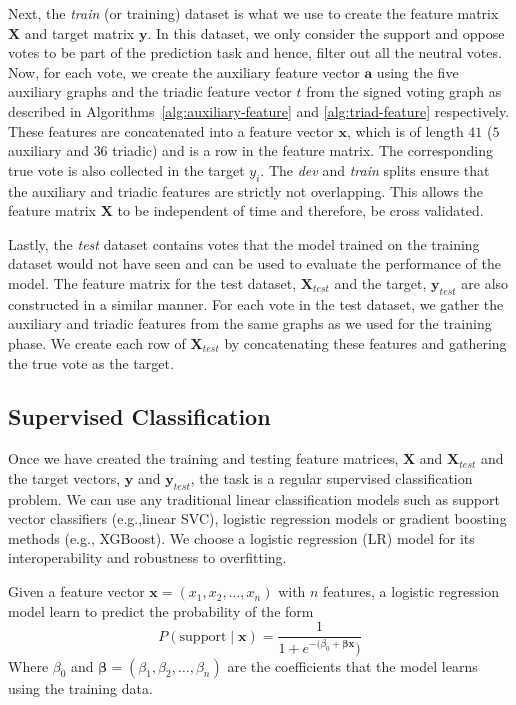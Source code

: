 Next, the \textit{train} (or training) dataset is what we use to create the feature matrix $\mathbf{X}$ and target matrix $\mathbf{y}$.
In this dataset, we only consider the support and oppose votes to be part of the prediction task and hence, filter out all the neutral votes.
Now, for each vote, we create the auxiliary feature vector $\textbf{a}$ using the five auxiliary graphs and the triadic feature vector $t$ from the signed voting graph as described in Algorithms~\ref{alg:auxiliary-feature} and \ref{alg:triad-feature} respectively.
These features are concatenated into a feature vector $\textbf{x}$, which is of length $41$ ($5$ auxiliary and $36$ triadic) and is a row in the feature matrix.
The corresponding true vote is also collected in the target $y_i$.
The \textit{dev} and \textit{train} splits ensure that the auxiliary and triadic features are strictly not overlapping.
This allows the feature matrix $\textbf{X}$ to be independent of time and therefore, be cross validated.

Lastly, the \textit{test} dataset contains votes that the model trained on the training dataset would not have seen and can be used to evaluate the performance of the model.
The feature matrix for the test dataset, $\mathbf{X}_{test}$ and the target, $\mathbf{y}_{test}$ are also constructed in a similar manner.
For each vote in the test dataset, we gather the auxiliary and triadic features from the same graphs as we used for the training phase.
We create each row of $\mathbf{X}_{test}$ by concatenating these features and gathering the true vote as the target.

\subsection{Supervised Classification}
Once we have created the training and testing feature matrices, $\mathbf{X}$ and $\mathbf{X}_{test}$ and the target vectors, $\mathbf{y}$ and $\mathbf{y}_{test}$, the task is a regular supervised classification problem.
We can use any traditional linear classification models such as support vector classifiers (e.g.,linear SVC), logistic regression models or gradient boosting methods (e.g., XGBoost).
We choose a logistic regression (LR) model for its interoperability and robustness to overfitting. 

Given a feature vector $\mathbf{x}=(x_{1},x_{2},\dots,x_{n})$ with $n$ features, a logistic regression model learn to predict the probability of the form 
\begin{equation}
    P(\text{support} \mid \mathbf{x}) = \frac{1}{1+e^{-(\beta_{0} + \boldsymbol{\beta}\mathbf{x}})}
\end{equation}
Where $\beta_{0}$ and $\boldsymbol{\beta} = (\beta_{1},\beta_{2},\dots,\beta_{n})$ are the coefficients that the model learns using the training data.

